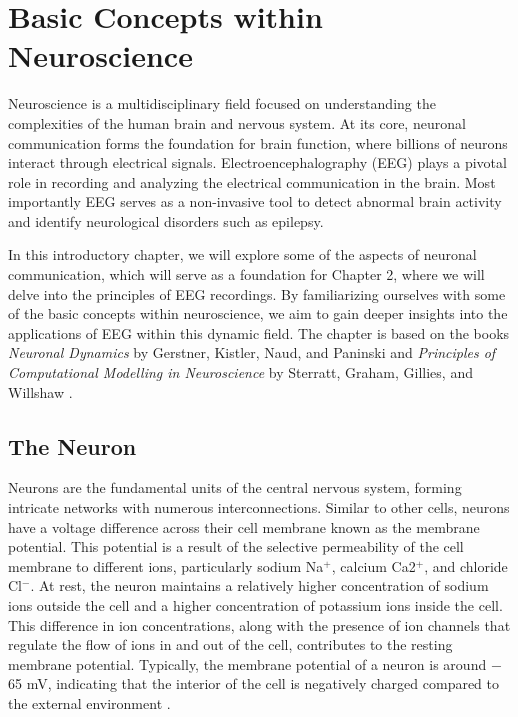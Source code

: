 \documentclass[a4paper, UKenglish, 11pt]{uiomaster}
\begin{document}
\chapter{Basic Concepts within Neuroscience} \label{chap:intro_neuro}

Neuroscience is a multidisciplinary field focused on understanding the complexities of the human brain and nervous system. At its core, neuronal communication forms the foundation for brain function, where billions of neurons interact through electrical signals. Electroencephalography (EEG) plays a pivotal role in recording and analyzing the electrical communication in the brain. Most importantly EEG serves as a non-invasive tool to detect abnormal brain activity and identify neurological disorders such as epilepsy.

In this introductory chapter, we will explore some of the aspects of neuronal communication, which will serve as a foundation for Chapter 2, where we will delve into the principles of EEG recordings. By familiarizing ourselves with some of the basic concepts within neuroscience, we aim to gain deeper insights into the applications of EEG within this dynamic field. The chapter is based on the books \textit{Neuronal Dynamics} by Gerstner, Kistler, Naud, and Paninski \cite{gerstner2014neuronal} and \textit{Principles of Computational Modelling in Neuroscience} by Sterratt, Graham, Gillies, and Willshaw \cite{sterratt2011principles}.



\section{The Neuron}
Neurons are the fundamental units of the central nervous system, forming intricate networks with numerous interconnections. Similar to other cells, neurons have a voltage difference across their cell membrane known as the membrane potential. This potential is a result of the selective permeability of the cell membrane to different ions, particularly sodium Na$^+$, calcium Ca2$^+$, and chloride Cl$^-$. At rest, the neuron maintains a relatively higher concentration of sodium ions outside the cell and a higher concentration of potassium ions inside the cell. This difference in ion concentrations, along with the presence of ion channels that regulate the flow of ions in and out of the cell, contributes to the resting membrane potential. Typically, the membrane potential of a neuron is around $-$65 mV, indicating that the interior of the cell is negatively charged compared to the external environment \cite{sterratt2011principles}.
\end{document}

